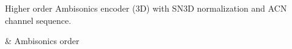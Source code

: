 Higher order Ambisonics encoder (3D) with SN3D normalization and ACN
channel sequence.

\begin{tscattributes}
 & Ambisonics order\\
\end{tscattributes}
